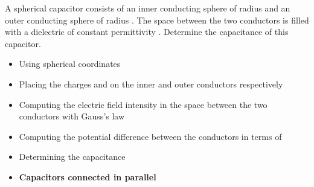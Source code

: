 \begin{ELexample}{}

A spherical capacitor consists of an inner conducting sphere of radius  and an outer conducting sphere of radius . The space between the two conductors is filled with a dielectric of constant permittivity \ELim{\epsilon}. Determine the capacitance of this capacitor.


\begin{ELsolution}

\begin{itemize}
\tightlist
\item
  Using spherical coordinates
\item
  Placing the charges  and  on the inner and outer conductors respectively
\item
  Computing the electric field intensity in the space between the two conductors with Gauss's law
\end{itemize}


\begin{itemize}
\tightlist
\item
  Computing the potential difference between the conductors in terms of 
\end{itemize}


\begin{itemize}
\tightlist
\item
  Determining the capacitance
\end{itemize}


\end{ELsolution}

\end{ELexample}

\begin{ELunit}

\begin{itemize}
\tightlist
\item
  \textbf{Capacitors connected in parallel}
\end{itemize}



\end{ELunit}

